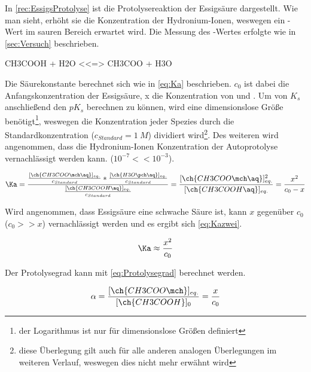 \documentclass{article}
\begin{document}
      In \ref{rec:EssigsProtolyse} ist die Protolysereaktion der Essigsäure dargestellt. Wie man sieht, erhöht sie die Konzentration der Hydronium-Ionen, weswegen ein \pH-Wert im sauren Bereich erwartet wird. Die Messung des \pH-Wertes erfolgte wie in \ref{sec:Versuch} beschrieben.
      
      \begin{reaction}
        CH3COOH\aq{} + H2O <<=> CH3COO\mch[]\aq{} + H3O\pch\aq{} \label{rec:EssigsProtolyse} \\
      \end{reaction}
      
      Die Säurekonstante \Ka berechnet sich wie in \eqref{eq:Ka} beschrieben. $c_{0}$ ist dabei die Anfangskonzentration der Essigsäure, x die Konzentration von  und . Um von $K_{s}$ anschließend den $pK_{s}$ berechnen zu können, wird eine dimensionslose Größe benötigt\footnote{der Logarithmus ist nur für dimensionslose Größen definiert}, weswegen die Konzentration jeder Spezies durch die Standardkonzentration ($c_{Standard} = \SI[mode=text]{1}{M}$) dividiert wird\footnote{diese Überlegung gilt auch für alle anderen analogen Überlegungen im weiteren Verlauf, weswegen dies nicht mehr erwähnt wird}. Des weiteren wird angenommen, dass die Hydronium-Ionen Konzentration der Autoprotolyse vernachlässigt werden kann. ($10^{-7} << 10^{-3}$). 
      
      \begin{equation}
        \Ka = \frac{\frac{[\ch{CH3COO\mch\aq}]_{eq.}}{c_{Standard}}*\frac{[\ch{H3O\pch\aq}]_{eq.}}{c_{Standard}}}{\frac{[\ch{CH3COOH\aq}]_{eq.}}{c_{Standard}}} = \frac{[\ch{CH3COO\mch\aq}]_{eq.}^2}{[\ch{CH3COOH\aq}]_{eq.}} = \frac{x^2}{c_{0}-x} \label{eq:Ka}
      \end{equation}
      
      Wird angenommen, dass Essigsäure eine schwache Säure ist, kann $x$ gegenüber $c_{0}$ ($c_{0} >> x$) vernachlässigt werden und es ergibt sich \eqref{eq:Kazwei}.
      
      \begin{equation}
        \Ka \approx \frac{x^2}{c_{0}} \label{eq:Kazwei}
      \end{equation}
      
      Der Protolysegrad kann mit \eqref{eq:Protolysegrad} berechnet werden.
      
      \begin{equation}
        \alpha = \frac{[\ch{CH3COO\mch}]_{eq.}}{[\ch{CH3COOH}]_{0}} = \frac{x}{c_{0}} \label{eq:Protolysegrad}
      \end{equation}
      
\end{document}
